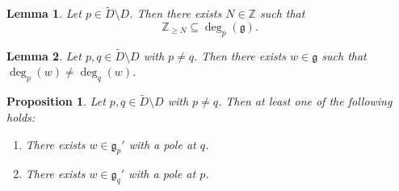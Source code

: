 \documentclass[10pt,a4paper]{amsart}
\newtheorem{lemma}{Lemma}
\newtheorem{proposition}{Proposition}
\def\ZZ{\mathbb{Z}}
\def\g{\mathfrak{g}}
\begin{document}
\begin{lemma}\label{lem:poles can be arbitrarily large}
    Let $p \in \widetilde{D} \setminus D$. Then there exists $N \in \ZZ$ such that
    $$\ZZ_{\geq N} \subseteq \deg_p(\g).$$
\end{lemma}

\begin{lemma}\label{lem:degrees at different points are different}
    Let $p,q \in \widetilde{D} \setminus D$ with $p \neq q$. Then there exists $w \in \g$ such that $\deg_p(w) \neq \deg_q(w)$.
\end{lemma}

\begin{proposition}\label{prop:dichotomy of poles at p and q}
    Let $p,q \in \widetilde{D} \setminus D$ with $p \neq q$. Then at least one of the following holds:
    \begin{enumerate}
        \item There exists $w \in \g_p'$ with a pole at $q$.
        \item There exists $w \in \g_q'$ with a pole at $p$.
    \end{enumerate}
\end{proposition}
\end{document}
